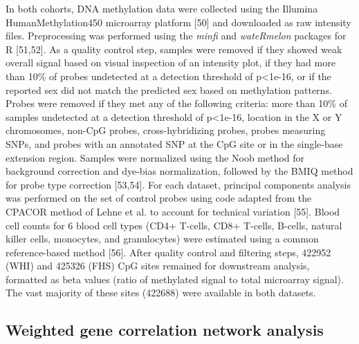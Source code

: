 \documentclass[]{bmcart}
\theoremstyle{definition}
\theoremstyle{definition}
\theoremstyle{definition}
\theoremstyle{remark}
\begin{document}
In both cohorts, DNA methylation data were collected using the Illumina
HumanMethylation450 microarray platform {[}50{]} and downloaded as raw
intensity files. Preprocessing was performed using the \emph{minfi} and
\emph{wateRmelon} packages for R {[}51,52{]}. As a quality control step,
samples were removed if they showed weak overall signal based on visual
inspection of an intensity plot, if they had more than 10\% of probes
undetected at a detection threshold of p\textless{}1e-16, or if the
reported sex did not match the predicted sex based on methylation
patterns. Probes were removed if they met any of the following criteria:
more than 10\% of samples undetected at a detection threshold of
p\textless{}1e-16, location in the X or Y chromosomes, non-CpG probes,
cross-hybridizing probes, probes measuring SNPs, and probes with an
annotated SNP at the CpG site or in the single-base extension region.
Samples were normalized using the Noob method for background correction
and dye-bias normalization, followed by the BMIQ method for probe type
correction {[}53,54{]}. For each dataset, principal components analysis
was performed on the set of control probes using code adapted from the
CPACOR method of Lehne et al. to account for technical variation
{[}55{]}. Blood cell counts for 6 blood cell types (CD4+ T-cells, CD8+
T-cells, B-cells, natural killer cells, monocytes, and granulocytes)
were estimated using a common reference-based method {[}56{]}. After
quality control and filtering steps, 422952 (WHI) and 425326 (FHS) CpG
sites remained for downstream analysis, formatted as beta values (ratio
of methylated signal to total microarray signal). The vast majority of
these sites (422688) were available in both datasets.

\subsection{Weighted gene correlation network
analysis}\label{weighted-gene-correlation-network-analysis}
\end{document}
